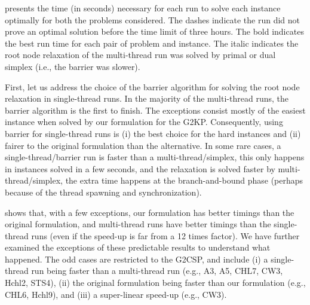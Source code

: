 \documentclass[9pt]{entcs}
\begin{document}
 presents the time (in seconds) necessary for each run to solve each instance optimally for both the problems considered.
The dashes indicate the run did not prove an optimal solution before the time limit of three hours.
The bold indicates the best run time for each pair of problem and instance.
The italic indicates the root node relaxation of the multi-thread run was solved by primal or dual simplex (i.e., the barrier was slower).

First, let us address the choice of the barrier algorithm for solving the root node relaxation in single-thread runs.
In the majority of the multi-thread runs, the barrier algorithm is the first to finish.
The exceptions consist mostly of the easiest instance when solved by our formulation for the G2KP.
Consequently, using barrier for single-thread runs is (i) the best choice for the hard instances and (ii) fairer to the original formulation than the alternative.
In some rare cases, a single-thread/barrier run is faster than a multi-thread/simplex, this only happens in instances solved in a few seconds, and the relaxation is solved faster by multi-thread/simplex, the extra time happens at the branch-and-bound phase (perhaps because of the thread spawning and synchronization).

 shows that, with a few exceptions, our formulation has better timings than the original formulation, and multi-thread runs have better timings than the single-thread runs (even if the speed-up is far from a 12 times factor).
We have further examined the exceptions of these predictable results to understand what happened.
The odd cases are restricted to the G2CSP, and include (i) a single-thread run being faster than a multi-thread run (e.g., A3, A5, CHL7, CW3, Hchl2, STS4), (ii) the original formulation being faster than our formulation (e.g., CHL6, Hchl9), and (iii) a super-linear speed-up (e.g., CW3).
\end{document}
